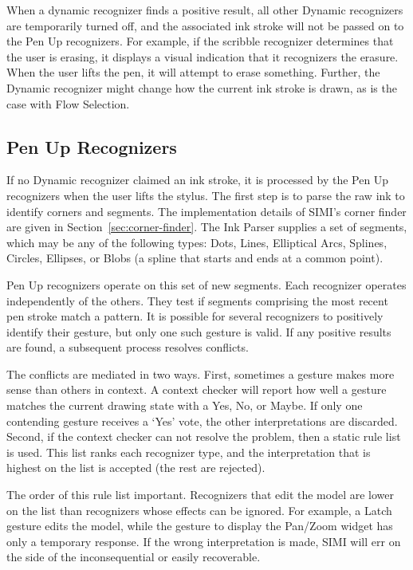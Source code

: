 When a dynamic recognizer finds a positive result, all other Dynamic
recognizers are temporarily turned off, and the associated ink stroke
will not be passed on to the Pen Up recognizers. For example, if the
scribble recognizer determines that the user is erasing, it displays a
visual indication that it recognizers the erasure. When the user lifts
the pen, it will attempt to erase something. Further, the Dynamic
recognizer might change how the current ink stroke is drawn, as is the
case with Flow Selection.

\subsection{Pen Up Recognizers}

If no Dynamic recognizer claimed an ink stroke, it is processed by the
Pen Up recognizers when the user lifts the stylus. The first step is
to parse the raw ink to identify corners and segments. The
implementation details of SIMI's corner finder are given in
Section~\ref{sec:corner-finder}. The Ink Parser supplies a set of
segments, which may be any of the following types: Dots, Lines,
Elliptical Arcs, Splines, Circles, Ellipses, or Blobs (a spline that
starts and ends at a common point).

Pen Up recognizers operate on this set of new segments. Each
recognizer operates independently of the others. They test if segments
comprising the most recent pen stroke match a pattern. It is possible
for several recognizers to positively identify their gesture, but only
one such gesture is valid. If any positive results are found, a
subsequent process resolves conflicts.

The conflicts are mediated in two ways. First, sometimes a gesture
makes more sense than others in context. A context checker will report
how well a gesture matches the current drawing state with a Yes, No,
or Maybe. If only one contending gesture receives a `Yes' vote, the
other interpretations are discarded. Second, if the context checker
can not resolve the problem, then a static rule list is used. This
list ranks each recognizer type, and the interpretation that is
highest on the list is accepted (the rest are rejected).  

The order of this rule list important. Recognizers that edit the model
are lower on the list than recognizers whose effects can be
ignored. For example, a Latch gesture edits the model, while the
gesture to display the Pan/Zoom widget has only a temporary
response. If the wrong interpretation is made, SIMI will err on the
side of the inconsequential or easily recoverable.

